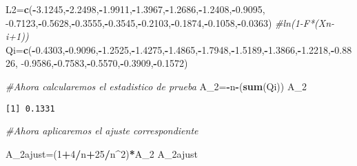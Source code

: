 \documentclass[
  a4paper,
  oneside,
  openany]{book}
\newenvironment{Shaded}{\begin{snugshade}}{\end{snugshade}}
\newcommand{\CommentTok}[1]{\textcolor[rgb]{0.56,0.35,0.01}{\textit{#1}}}
\newcommand{\DecValTok}[1]{\textcolor[rgb]{0.00,0.00,0.81}{#1}}
\newcommand{\FloatTok}[1]{\textcolor[rgb]{0.00,0.00,0.81}{#1}}
\newcommand{\KeywordTok}[1]{\textcolor[rgb]{0.13,0.29,0.53}{\textbf{#1}}}
\newcommand{\NormalTok}[1]{#1}
\newcommand{\OperatorTok}[1]{\textcolor[rgb]{0.81,0.36,0.00}{\textbf{#1}}}
\begin{document}
\begin{Shaded}
\begin{Highlighting}[]
\NormalTok{L2=}\KeywordTok{c}\NormalTok{(}\OperatorTok{{-}}\FloatTok{3.1245}\NormalTok{,}\OperatorTok{{-}}\FloatTok{2.2498}\NormalTok{,}\OperatorTok{{-}}\FloatTok{1.9911}\NormalTok{,}\OperatorTok{{-}}\FloatTok{1.3967}\NormalTok{,}\OperatorTok{{-}}\FloatTok{1.2686}\NormalTok{,}\OperatorTok{{-}}\FloatTok{1.2408}\NormalTok{,}\OperatorTok{{-}}\FloatTok{0.9095}\NormalTok{,}
\FloatTok{{-}0.7123}\NormalTok{,}\OperatorTok{{-}}\FloatTok{0.5628}\NormalTok{,}\OperatorTok{{-}}\FloatTok{0.3555}\NormalTok{,}\OperatorTok{{-}}\FloatTok{0.3545}\NormalTok{,}\OperatorTok{{-}}\FloatTok{0.2103}\NormalTok{,}\OperatorTok{{-}}\FloatTok{0.1874}\NormalTok{,}\OperatorTok{{-}}\FloatTok{0.1058}\NormalTok{,}\OperatorTok{{-}}\FloatTok{0.0363}\NormalTok{)  }\CommentTok{\#ln(1{-}F*(Xn{-}i+1))}
\NormalTok{Qi=}\KeywordTok{c}\NormalTok{(}\OperatorTok{{-}}\FloatTok{0.4303}\NormalTok{,}\OperatorTok{{-}}\FloatTok{0.9096}\NormalTok{,}\OperatorTok{{-}}\FloatTok{1.2525}\NormalTok{,}\OperatorTok{{-}}\FloatTok{1.4275}\NormalTok{,}\OperatorTok{{-}}\FloatTok{1.4865}\NormalTok{,}\OperatorTok{{-}}\FloatTok{1.7948}\NormalTok{,}\OperatorTok{{-}}\FloatTok{1.5189}\NormalTok{,}\OperatorTok{{-}}\FloatTok{1.3866}\NormalTok{,}\OperatorTok{{-}}\FloatTok{1.2218}\NormalTok{,}\OperatorTok{{-}}\FloatTok{0.8826}\NormalTok{,}
\FloatTok{{-}0.9586}\NormalTok{,}\OperatorTok{{-}}\FloatTok{0.7583}\NormalTok{,}\OperatorTok{{-}}\FloatTok{0.5570}\NormalTok{,}\OperatorTok{{-}}\FloatTok{0.3909}\NormalTok{,}\OperatorTok{{-}}\FloatTok{0.1572}\NormalTok{)}

\CommentTok{\#Ahora calcularemos el estadistico de prueba}
\NormalTok{A\_}\DecValTok{2}\NormalTok{=}\OperatorTok{{-}}\NormalTok{n}\OperatorTok{{-}}\NormalTok{(}\KeywordTok{sum}\NormalTok{(Qi))}
\NormalTok{A\_}\DecValTok{2}
\end{Highlighting}
\end{Shaded}

\begin{verbatim}
[1] 0.1331
\end{verbatim}

\begin{Shaded}
\begin{Highlighting}[]
\CommentTok{\#Ahora aplicaremos el ajuste correspondiente}

\NormalTok{A\_2ajust=(}\DecValTok{1}\OperatorTok{+}\DecValTok{4}\OperatorTok{/}\NormalTok{n}\OperatorTok{+}\DecValTok{25}\OperatorTok{/}\NormalTok{n}\OperatorTok{\^{}}\DecValTok{2}\NormalTok{)}\OperatorTok{*}\NormalTok{A\_}\DecValTok{2}
\NormalTok{A\_2ajust}
\end{Highlighting}
\end{Shaded}
\end{document}
